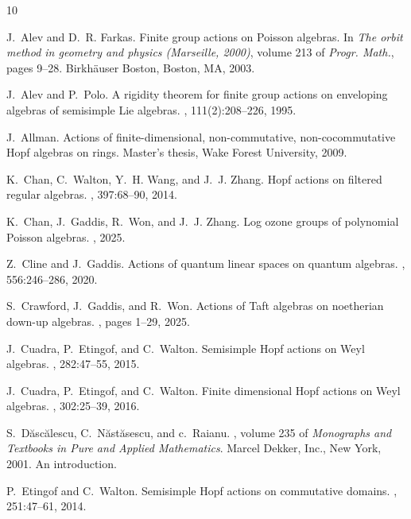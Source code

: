 \documentclass[reqno]{amsart}
\numberwithin{equation}{section}
\theoremstyle{definition}
\begin{document}
\begin{thebibliography}{10}

J.~Alev and D.~R. Farkas.
\newblock Finite group actions on {P}oisson algebras.
\newblock In {\em The orbit method in geometry and physics ({M}arseille,
  2000)}, volume 213 of {\em Progr. Math.}, pages 9--28. Birkh\"auser Boston,
  Boston, MA, 2003.

J.~Alev and P.~Polo.
\newblock A rigidity theorem for finite group actions on enveloping algebras of
  semisimple {L}ie algebras.
, 111(2):208--226, 1995.

J.~Allman.
\newblock Actions of finite-dimensional, non-commutative, non-cocommutative
  {H}opf algebras on rings.
\newblock Master's thesis, Wake Forest University, 2009.

K.~Chan, C.~Walton, Y.~H. Wang, and J.~J. Zhang.
\newblock Hopf actions on filtered regular algebras.
, 397:68--90, 2014.

K.~Chan, J.~Gaddis, R.~Won, and J.~J. Zhang.
\newblock Log ozone groups of polynomial {P}oisson algebras.
, 2025.

Z.~Cline and J.~Gaddis.
\newblock Actions of quantum linear spaces on quantum algebras.
, 556:246--286, 2020.

S.~Crawford, J.~Gaddis, and R.~Won.
\newblock Actions of {T}aft algebras on noetherian down-up algebras.
,
  pages 1--29, 2025.

J.~Cuadra, P.~Etingof, and C.~Walton.
\newblock Semisimple {H}opf actions on {W}eyl algebras.
, 282:47--55, 2015.

J.~Cuadra, P.~Etingof, and C.~Walton.
\newblock Finite dimensional {H}opf actions on {W}eyl algebras.
, 302:25--39, 2016.

S.~D\u{a}sc\u{a}lescu, C.~N\u{a}st\u{a}sescu, and c.~Raianu.
, volume 235 of {\em Monographs and Textbooks in
  Pure and Applied Mathematics}.
\newblock Marcel Dekker, Inc., New York, 2001.
\newblock An introduction.

P.~Etingof and C.~Walton.
\newblock Semisimple {H}opf actions on commutative domains.
, 251:47--61, 2014.


\end{thebibliography}
\end{document}
